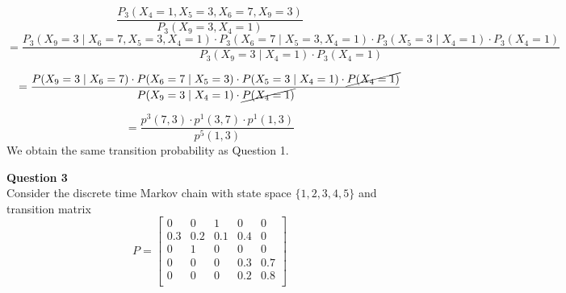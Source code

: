 \documentclass[12pt]{article}
\begin{document}
$$
\frac{P_3(X_{4} = 1, X_{5} = 3, X_{6} = 7, X_{9}=3)}{P_3(X_9 = 3, X_4=1)} 
$$
$$
= \frac{P_3(X_9=3\;|\;X_6=7, X_5=3, X_4=1)\cdot P_3(X_6=7\;|\; X_5=3, X_4=1)\cdot P_3(X_5=3\;|\;X_4=1)\cdot P_3(X_4=1)}{P_3(X_9=3\;|\;X_4=1)\cdot P_3(X_4=1)}
$$
 
$$
= \frac{P(X_9=3\;|\;X_6=7)\cdot P(X_6=7\;|\; X_5=3)\cdot P(X_5=3\;|\;X_4=1)\cdot \cancel{P(X_4=1)}}{P(X_9=3\;|\;X_4=1)\cdot \cancel{P(X_4=1)}}
$$

$$
= \frac{p^3(7,3)\cdot p^1(3,7)\cdot p^1(1,3)}{p^5(1,3)}
$$
\noindent
We obtain the same transition probability as Question 1.

\newpage
\noindent
\textbf{Question 3}\\
Consider the discrete time Markov chain with state space $\{1, 2, 3, 4, 5\}$ and transition matrix
$$P = 
\begin{bmatrix}
    0&0&1&0&0\\
    0.3&0.2&0.1&0.4&0\\
    0&1&0&0&0\\
    0&0&0&0.3&0.7\\
    0&0&0&0.2&0.8\\
\end{bmatrix}
$$
\end{document}
